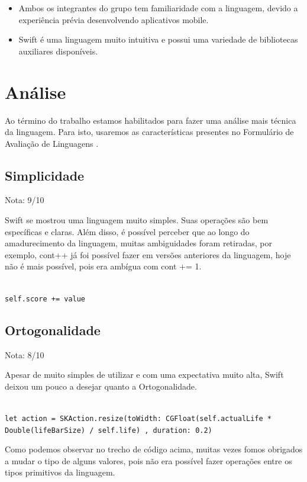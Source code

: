 \documentclass[rel_mlp]{iiufrgs}
\begin{document}
\begin{itemize}[leftmargin=3em]
\setlength{\itemindent}{1em}

    \item Ambos os integrantes do grupo tem familiaridade com a linguagem, devido a experiência prévia desenvolvendo aplicativos mobile.

    \item Swift é uma linguagem muito intuitiva e possui uma variedade de bibliotecas auxiliares disponíveis.

\end{itemize}

\section{Análise}

Ao término do trabalho estamos habilitados para fazer uma análise mais técnica da linguagem. Para isto, usaremos as características presentes no Formulário de Avaliação de Linguagens \cite{catp_01}.

\subsection{Simplicidade}

Nota: 9/10

Swift se mostrou uma linguagem muito simples. Suas operações são bem específicas e claras. Além disso, é possível perceber que ao longo do amadurecimento da linguagem, muitas ambiguidades foram retiradas, por exemplo, cont++ já foi possível fazer em versões anteriores da linguagem, hoje não é mais possível, pois era ambígua com cont += 1.

\texttt{
\\self.score += value
}

\subsection{Ortogonalidade}

Nota: 8/10

Apesar de muito simples de utilizar e com uma expectativa muito alta, Swift deixou um pouco a desejar quanto a Ortogonalidade.

\texttt{
\\let action = SKAction.resize(toWidth: CGFloat(self.actualLife * Double(lifeBarSize) / self.life) , duration: 0.2)
}

Como podemos observar no trecho de código acima, muitas vezes fomos obrigados a mudar o tipo de alguns valores, pois não era possível fazer operações entre os tipos primitivos da linguagem.
\end{document}
